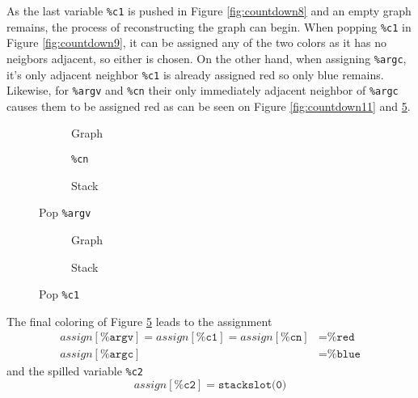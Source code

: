 \documentclass{article}
\begin{document}
\noindent As the last variable \texttt{\%c1} is pushed in Figure \ref{fig:countdown8} and an empty graph remains, the process of reconstructing the graph can begin. When popping \texttt{\%c1} in Figure \ref{fig:countdown9}, it can be assigned any of the two colors as it has no neigbors adjacent, so either is chosen. On the other hand, when assigning \texttt{\%argc}, it's only adjacent neighbor \texttt{\%c1} is already assigned red so only blue remains. Likewise, for \texttt{\%argv} and \texttt{\%cn} their only immediately adjacent neighbor of \texttt{\%argc} causes them to be assigned red as can be seen on Figure \ref{fig:countdown11} and \ref{fig:countdown12}.

\begin{figure}[H]
  \centering
  \begin{minipage}[c]{0.32\linewidth}
    \begin{subfigure}[b]{0.70\textwidth}
       
      \caption{Graph}\label{fig:countdown.dot11}
    \end{subfigure}
    \begin{subfigure}[b]{0.27\textwidth}
      \centering
      \texttt{\%cn}
      \vspace{0.5em}
      \caption{Stack}\label{fig:countdown.stack11}
    \end{subfigure}
    \caption{Pop \texttt{\%argv}} \label{fig:countdown11}
  \end{minipage}%
  \begin{minipage}[c]{0.32\linewidth}
    \begin{subfigure}[b]{0.70\textwidth}
       
      \caption{Graph}\label{fig:countdown.dot12}
    \end{subfigure}
    \begin{subfigure}[b]{0.27\textwidth}
      \caption{Stack}\label{fig:countdown.stack12} 
    \end{subfigure}
    \caption{Pop \texttt{\%c1}}\label{fig:countdown12} 
  \end{minipage}%
\end{figure}
\noindent The final coloring of Figure \ref{fig:countdown12} leads to the assignment 
\begin{align*}
  \mathit{assign[\texttt{\%argv}]} = \mathit{assign[\texttt{\%c1}]} = \mathit{assign[\texttt{\%cn}]} &= \texttt{\%red}\\
  \mathit{assign[\texttt{\%argc}]} &= \texttt{\%blue}
\end{align*}
and the spilled variable \texttt{\%c2}
\[
  \mathit{assign[\texttt{\%c2}]} = \texttt{stackslot(0)}
\]
\end{document}
